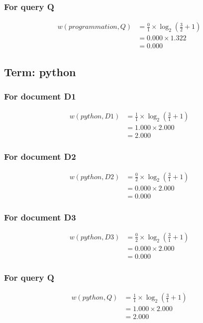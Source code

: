 \documentclass{article}
\begin{document}
\subsubsection*{For query Q}
\begin{align}
w(programmation, Q) &= \frac{0}{1} \times \log_{2}\left(\frac{3}{2} + 1\right) \\
&= 0.000 \times 1.322 \\
&= 0.000
\end{align}

\subsection{Term: python}
\subsubsection*{For document D1}
\begin{align}
w(python, D1) &= \frac{1}{1} \times \log_{2}\left(\frac{3}{1} + 1\right) \\
&= 1.000 \times 2.000 \\
&= 2.000
\end{align}

\subsubsection*{For document D2}
\begin{align}
w(python, D2) &= \frac{0}{2} \times \log_{2}\left(\frac{3}{1} + 1\right) \\
&= 0.000 \times 2.000 \\
&= 0.000
\end{align}

\subsubsection*{For document D3}
\begin{align}
w(python, D3) &= \frac{0}{2} \times \log_{2}\left(\frac{3}{1} + 1\right) \\
&= 0.000 \times 2.000 \\
&= 0.000
\end{align}

\subsubsection*{For query Q}
\begin{align}
w(python, Q) &= \frac{1}{1} \times \log_{2}\left(\frac{3}{1} + 1\right) \\
&= 1.000 \times 2.000 \\
&= 2.000
\end{align}
\end{document}
